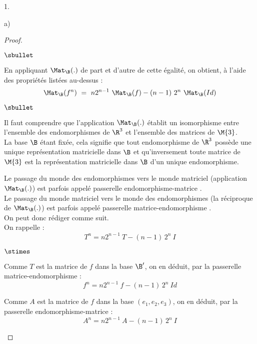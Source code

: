 \documentclass[11pt]{article}%
\renewcommand{\id}{Id}
\begin{document}
\begin{noliste}{1.}
\begin{noliste}{a)}
\begin{proof}
\begin{noliste}{$\sbullet$}
      \item En appliquant $\Mat_{\B}(.)$ de part et d'autre de cette
        égalité, on obtient, à l'aide des propriétés listées au-dessus
        :
        \[
        \Mat_{\B}(f^n) \ = \ n2^{n-1} \ \Mat_{\B}(f) - (n-1) \ 2^{n} \
        \Mat_{\B}(\id)
        \]
      \end{noliste}
      \begin{remark}%
        \begin{noliste}{$\sbullet$}
        \item Il faut comprendre que l'application $\Mat_{\B}(.)$
          établit un isomorphisme entre l'ensemble des endomorphismes
          de $\R^3$ et l'ensemble des matrices de $\M{3}$.\\
          La base $\B$ étant fixée, cela signifie que tout
          endomorphisme de $\R^3$ possède une unique représentation
          matricielle dans $\B$ et qu'inversement toute matrice de
          $\M{3}$ est la représentation matricielle dans $\B$ d'un
          unique endomorphisme.
        \item Le passage du monde des endomorphismes vers le monde
          matriciel (application $\Mat_{\B}(.)$) est parfois appelé
          \og passerelle endomorphisme-matrice \fg{}. \\
          Le passage du monde matriciel vers le monde des
          endomorphismes (la réciproque de $\Mat_{\B}(.)$) est parfois
          appelé \og passerelle matrice-endomorphisme \fg{}.\\
          On peut donc rédiger comme suit.\\[.2cm]
          On rappelle :
          \[
          T^n = n 2^{n-1} \ T - (n-1) \, 2^n \ I
          \]
          \begin{noliste}{$\stimes$}
          \item Comme $T$ est la matrice de $f$ dans la base $\B'$, on
            en déduit, par la passerelle matrice-endomorphisme :
            \[
            f^n = n 2^{n-1} \ f - (n-1) \, 2^n \ Id
            \]
          \item Comme $A$ est la matrice de $f$ dans la base $(e_1,
            e_2, e_3)$, on en déduit, par la passerelle
            endomorphisme-matrice : 
            \[
            A^n = n 2^{n-1} \ A - (n-1) \, 2^n \ I
            \]
          \end{noliste}
        \end{noliste}
      \end{remark}

\end{proof}
\end{noliste}
\end{noliste}
\end{document}

